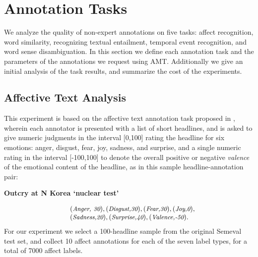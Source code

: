 \documentclass[11pt]{article}
\begin{document}

 \vspace*{-0.05in}
\section{ Annotation Tasks }

We analyze the quality of non-expert annotations on five tasks:
affect recognition, word similarity, recognizing textual entailment,
temporal event recognition, and word sense disambiguation. In this
section we define each annotation task and the parameters of the
annotations we request using AMT.  Additionally we give an initial
analysis of the task results, and summarize the cost of the experiments.
\subsection{ Affective Text Analysis }

This experiment is based on the affective text annotation task proposed in , wherein each annotator is presented with a list of short headlines, and is asked to give numeric judgments in the interval [0,100] rating the headline for six emotions: anger, disgust, fear, joy, sadness, and surprise, and a single numeric rating in the interval [-100,100] to denote the overall positive or negative \textit{valence} of the emotional content of the headline, as in
this sample headline-annotation pair:
\begin{center} \textbf{Outcry at N Korea `nuclear test'} \end{center}
\begin{equation*}
\begin{array}{ll}
&\small(\textit{Anger, 30}),(\textit{Disgust,30}),(\textit{Fear,30}), (\textit{Joy,0}),\\
&\small(\textit{Sadness,20}),(\textit{Surprise,40}),(\textit{Valence,-50}).
\end{array}
\end{equation*}
For our experiment we select a 100-headline sample from the original Semeval test set, and collect 10 affect annotations for each of the seven label types, for a total of 7000 affect labels.
\end{document}
